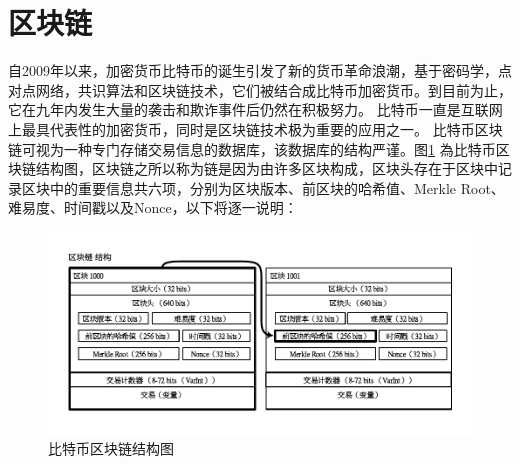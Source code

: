 		\section{区块链}
		自2009年以来，加密货币比特币的诞生引发了新的货币革命浪潮，基于密码学，点对点网络，共识算法和区块链技术，它们被结合成比特币加密货币。到目前为止，它在九年内发生大量的袭击和欺诈事件后仍然在积极努力。 比特币一直是互联网上最具代表性的加密货币，同时是区块链技术极为重要的应用之一。
		比特币区块链可视为一种专门存储交易信息的数据库，该数据库的结构严谨。图\ref{blockchain} 為⽐特币区块链结构图，区块链之所以称为链是因为由许多区块构成，区块头存在于区块中记录区块中的重要信息共六项，分别为区块版本、前区块的哈希值、Merkle Root、难易度、时间戳以及Nonce，以下将逐一说明：

			\begin{figure}[!htb]
				\centering
				\includegraphics[width = 1\textwidth]{blockchain.pdf}
				\caption{比特币区块链结构图}\label{blockchain}
			\end{figure}

